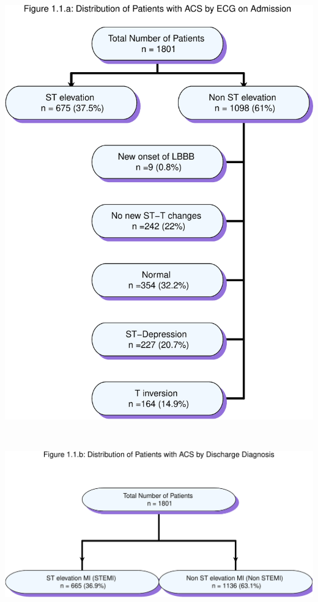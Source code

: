 \documentclass[
]{article}
\begin{document}
\includegraphics{ACSIS_2024_v1_pdf_files/figure-latex/unnamed-chunk-5-1.pdf}

\pagebreak

~

\includegraphics{ACSIS_2024_v1_pdf_files/figure-latex/unnamed-chunk-6-1.pdf}

\pagebreak
\end{document}

